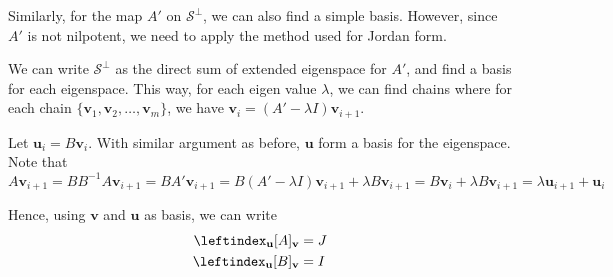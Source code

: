 \documentclass{article}
\newtheorem{lemma}[theorem]{Lemma}
\newcommand{\0}{\mathbf{0}}
\renewcommand{\vec}{\mathbf}
\newcommand{\vv}{\vec{v}}
\newcommand{\vu}{\vec{u}}
\newcommand{\inv}{^{-1}}
\newcommand{\N}{\mathbb{N}}
\newcommand{\vecspace}[1]{\mathcal{#1}}
\newcommand{\vsS}{\vecspace{S}}
\newcommand{\vsSp}{\vecspace{S}^\perp}
\DeclareMathOperator{\extker}{extker}
\newcommand{\id}{I}
\begin{document}
Similarly, for the map $A'$ on $\vsSp$, we can also find a simple basis.
However, since $A'$ is not nilpotent, we need to apply the method used for Jordan form.

We can write $\vsSp$ as the direct sum of extended eigenspace for $A'$, and find a basis for each eigenspace.
This way, for each eigen value $\lambda$, we can find chains where for each chain $\{\vv_1,\vv_2,\dots,\vv_m\}$, we have $\vv_i=(A'-\lambda\id)\vv_{i+1}$.

Let $\vu_i=B\vv_i$. With similar argument as before, $\vu$ form a basis for the eigenspace.
Note that
\begin{equation*}
    A\vv_{i+1}=BB\inv A\vv_{i+1}=BA'\vv_{i+1}=B(A'-\lambda\id)\vv_{i+1}+\lambda B\vv_{i+1}=B\vv_i+\lambda B\vv_{i+1}=\lambda\vu_{i+1} + \vu_i
\end{equation*}

Hence, using $\vv$ and $\vu$ as basis, we can write
\begin{align*}
    \leftindex_\vu[A]_\vv&=J\\
    \leftindex_\vu[B]_\vv&=I\\
\end{align*}









\end{document}
